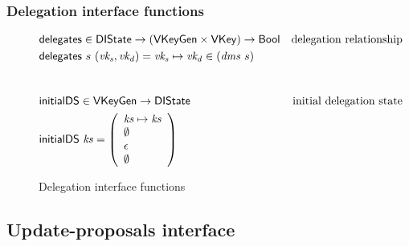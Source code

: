 \subsubsection{Delegation interface functions}
\label{sec:delegation-interface-functions}

\begin{figure}[htb]
  \begin{align*}
    & \fun{delegates} \in \DIState \to (\VKeyGen \times \VKey) \to \Bool & \text{delegation relationship}\\
    & \fun{delegates}~s~(\var{vk_s}, \var{vk_d}) = \var{vk_s} \mapsto \var{vk_d} \in (\var{dms}~s)\\
    \nextdef
    & \fun{initialDS} \in \VKeyGen \to \DIState & \text{initial delegation state}\\
    & \fun{initialDS}~\var{ks} =
      \left(
      \begin{array}{l}
        \var{ks} \mapsto \var{ks}\\
        \emptyset\\
        \epsilon\\
        \emptyset\\
      \end{array}
      \right)
  \end{align*}
  \caption{Delegation interface functions}
\end{figure}

\clearpage

\subsection{Update-proposals interface}
\label{sec:update-proposals-interface}

